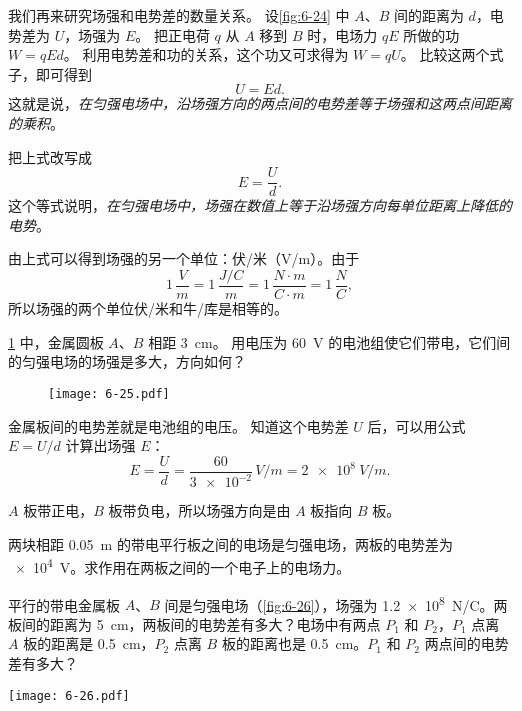 我们再来研究场强和电势差的数量关系。
设\cref{fig:6-24} 中 $A$、$B$ 间的距离为 $d$，电势差为 $U$，场强为 $E$。
把正电荷 $q$ 从 $A$ 移到 $B$ 时，电场力 $qE$ 所做的功 $W=qEd$。
利用电势差和功的关系，这个功又可求得为 $W=qU$。
比较这两个式子，即可得到
\[U=Ed.\]
这就是说，\emph{在匀强电场中，沿场强方向的两点间的电势差等于场强和这两点间距离的乘积}。

把上式改写成
\[E=\frac{U}{d}.\]
这个等式说明，\emph{在匀强电场中，场强在数值上等于沿场强方向每单位距离上降低的电势}。

由上式可以得到场强的另一个单位：伏/米（\unit{V/m}）。由于
\[1\,\frac{\unit{V}}{\unit{m}}=1\,\frac{\unit{J/C}}{\unit{m}}=1\,\frac{\unit{N}\cdot \unit{m}}{\unit{C}\cdot \unit{m}}=1\,\frac{\unit{N}}{\unit{C}},\]
所以场强的两个单位伏/米和牛/库是相等的。

\begin{example}
\cref{fig:6-25} 中，金属圆板 $A$、$B$ 相距 \qty{3}{cm}。
用电压为 \qty{60}{V} 的电池组使它们带电，它们间的匀强电场的场强是多大，方向如何？
\end{example}
\begin{figure}
	\texttt{[image: 6-25.pdf]}
	\caption{}\label{fig:6-25}
\end{figure}	

\begin{solution}
金属板间的电势差就是电池组的电压。
知道这个电势差 $U$ 后，可以用公式 $E=U/d$ 计算出场强 $E$：
\[E=\frac{U}{d}=\frac{60}{\num{3e-2}}\,\unit{V/m}=\qty{2e8}{V/m}.\]

$A$ 板带正电，$B$ 板带负电，所以场强方向是由 $A$ 板指向 $B$ 板。
\end{solution}

\begin{Practice}
\begin{question}
	\item 两块相距 \qty{0.05}{m} 的带电平行板之间的电场是匀强电场，两板的电势差为 \qty{e4}{V}。求作用在两板之间的一个电子上的电场力。
	\item 平行的带电金属板 $A$、$B$ 间是匀强电场（\cref{fig:6-26}），场强为 \qty{1.2e8}{N/C}。两板间的距离为 \qty{5}{cm}，两板间的电势差有多大？电场中有两点 $P_1$ 和 $P_2$，$P_1$ 点离 $A$ 板的距离是 \qty{0.5}{cm}，$P_2$ 点离 $B$ 板的距离也是 \qty{0.5}{cm}。$P_1$ 和 $P_2$ 两点间的电势差有多大？
	\begin{figurehere}
		\begin{minipage}{\linewidth}\centering
			\texttt{[image: 6-26.pdf]}
			\caption{}\label{fig:6-26}
		\end{minipage}
	\end{figurehere}	
\end{question}
\end{Practice}



